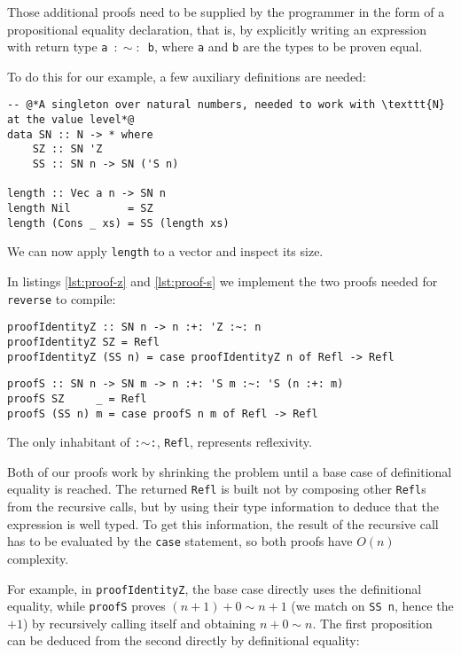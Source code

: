 Those additional proofs need to be supplied by the programmer in the form of a propositional equality declaration, that is, by explicitly writing an expression with return type \texttt{a $:\sim:$ b}, where \texttt{a} and \texttt{b} are the types to be proven equal.

To do this for our example, a few auxiliary definitions are needed:

\begin{lstlisting}[caption=Bringing \texttt{N} to the value level]
-- @*A singleton over natural numbers, needed to work with \texttt{N} at the value level*@
data SN :: N -> * where
    SZ :: SN 'Z
    SS :: SN n -> SN ('S n)

length :: Vec a n -> SN n
length Nil         = SZ
length (Cons _ xs) = SS (length xs)
\end{lstlisting}

We can now apply \texttt{length} to a vector and inspect its size.

In listings \ref{lst:proof-z} and \ref{lst:proof-s} we implement the two proofs needed for \texttt{reverse} to compile:

\begin{lstlisting}[caption=A proof that \texttt{'Z} is the right identity element in type-level addition, label=lst:proof-z]
proofIdentityZ :: SN n -> n :+: 'Z :~: n
proofIdentityZ SZ = Refl
proofIdentityZ (SS n) = case proofIdentityZ n of Refl -> Refl
\end{lstlisting}

\begin{lstlisting}[caption=A proof that $n+(m+1) \sim (n+m)+1$, label=lst:proof-s]
proofS :: SN n -> SN m -> n :+: 'S m :~: 'S (n :+: m)
proofS SZ     _ = Refl
proofS (SS n) m = case proofS n m of Refl -> Refl
\end{lstlisting}

The only inhabitant of \texttt{:$\sim$:}, \texttt{Refl}, represents reflexivity.

Both of our proofs work by shrinking the problem until a base case of definitional equality is reached.
The returned \texttt{Refl} is built not by composing other \texttt{Refl}s from the recursive calls, but by using their type information to deduce that the expression is well typed.
To get this information, the result of the recursive call has to be evaluated by the \texttt{case} statement, so both proofs have $O(n)$ complexity.

For example, in \texttt{proofIdentityZ}, the base case directly uses the definitional equality, while \texttt{proofS} proves $(n+1) + 0 \sim n+1$ (we match on \texttt{SS n}, hence the $+1$) by recursively calling itself and obtaining $n+0 \sim n$.
The first proposition can be deduced from the second directly by definitional equality:


